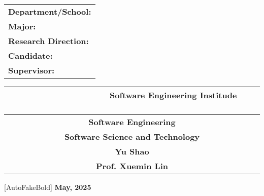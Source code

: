\vskip 1.4cm {
        \begin{center}
            \renewcommand\arraystretch{2}
            \begin{tabular}{l}
                \fontsize{10.5pt}{13.125pt}\selectfont \bf Department/School:         \\
                \fontsize{10.5pt}{13.125pt}\selectfont \bf Major:              \\
                \fontsize{10.5pt}{13.125pt}\selectfont \bf Research Direction: \\
                \fontsize{10.5pt}{13.125pt}\selectfont \bf Candidate:         \\
                \fontsize{10.5pt}{13.125pt}\selectfont \bf Supervisor:
            \end{tabular}
            \begin{tabular}{c}

                \fontsize{10.5pt}{13.125pt}\selectfont \bf ~~~~~~~~~~~~~~~~~ Software Engineering Institude ~~~~~~~~~~~~~~~~~ \\
                \hline \fontsize{10.5pt}{13.125pt}\selectfont \bf Software Engineering\\
                \hline \fontsize{10.5pt}{13.125pt}\selectfont \bf Software Science and Technology \\
                \hline \fontsize{10.5pt}{13.125pt}\selectfont \bf Yu Shao \\
                \hline \fontsize{10.5pt}{13.125pt}\selectfont \bf Prof. Xuemin Lin \\


                \hline
            \end{tabular}
        \end{center}}

\vspace{0.95cm}

\begin{center}
	[AutoFakeBold]
	{\fontsize{11pt}{17pt}\selectfont \bf \NSimSun May, 2025}
\end{center}

\cleardoublepage